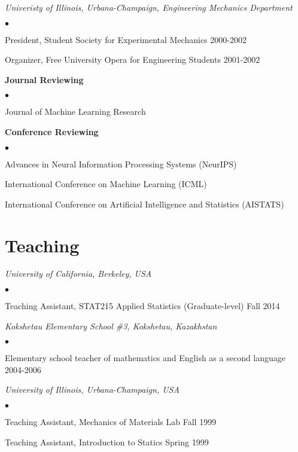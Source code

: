 \documentclass[margin,line]{res}
\newenvironment{list2}{
  \begin{list}{$\bullet$}{%
      \setlength{\itemsep}{0in}
      \setlength{\parsep}{0in} \setlength{\parskip}{0in}
      \setlength{\topsep}{0in} \setlength{\partopsep}{0in}
      \setlength{\leftmargin}{0.2in}}}{\end{list}}
\begin{document}
\begin{resume}
{\em Univeristy of Illinois, Urbana-Champaign, Engineering Mechanics Department}
\begin{list2}
    \item President, Student Society for Experimental Mechanics \hfill 2000-2002
    \item Organizer, Free University Opera for Engineering Students \hfill 2001-2002
\end{list2}


\textbf{Journal Reviewing}
\begin{list2}
\item Journal of Machine Learning Research
\end{list2}

\textbf{Conference Reviewing}
\begin{list2}
\item Advances in Neural Information Processing Systems (NeurIPS)
\item International Conference on Machine Learning (ICML)
\item International Conference on Artificial Intelligence and Statistics (AISTATS)
\end{list2}


\section{\sc Teaching}

\emph{University of California, Berkeley, USA}
\begin{list2}
\item Teaching Assistant, STAT215 Applied Statistics
(Graduate-level) \hfill Fall 2014
\end{list2}

\emph{Kokshetau Elementary School \#3, Kokshetau, Kazakhstan}
\begin{list2}
\item Elementary school teacher of mathematics and English as a second language
\hfill 2004-2006
\end{list2}

\emph{University of Illinois, Urbana-Champaign, USA}
\begin{list2}
\item Teaching Assistant, Mechanics of Materials Lab \hfill Fall 1999
\item Teaching Assistant, Introduction to Statics \hfill Spring 1999
\end{list2}






\end{resume}
\end{document}
